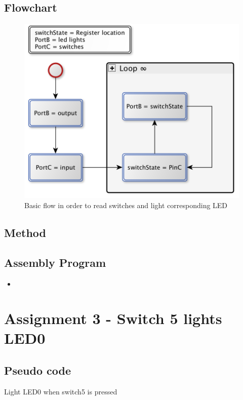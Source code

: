 \documentclass[a4paper, 12pt]{article}
\newcommand{\avrasm}[2]{
\begin{itemize}
\item[]
\end{itemize}
}
\begin{document}
\subsection{Flowchart}
\begin{figure}[h]
\centering
\includegraphics[scale=0.5]{Flowchart_pics/assignment2_pic.png} 
\caption{Basic flow in order to read switches and light corresponding LED}
\label{assign2.flow}
\end{figure}

\subsection{Method}

\newpage

\subsection{Assembly Program}
\avrasm{../src/a2.asm}{}
\newpage

\section{Assignment 3 - Switch 5 lights LED0}


\subsection{Pseudo code}
\begin{algorithm}
\begin{algorithmic}
\Repeat
{} 
\EndIf
{}
\Until{$\infty$}
\EndProcedure
\caption{Light LED0 when switch5 is pressed}
\label{assign2.pseudo}
\end{algorithmic}
\end{algorithm}
\end{document}
